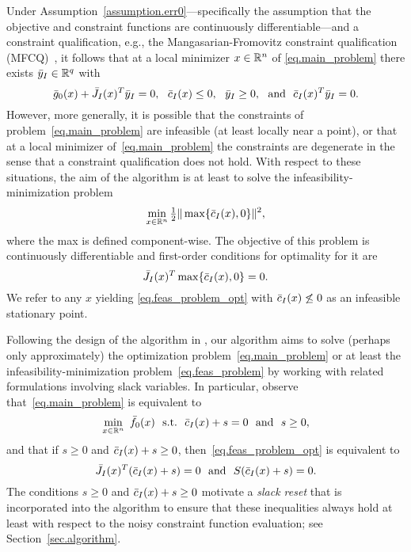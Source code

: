 Under Assumption~\ref{assumption.err0}---specifically the assumption that the objective and constraint functions are continuously differentiable---and a constraint qualification, e.g., the Mangasarian-Fromovitz constraint qualification (MFCQ)~\cite{MangFrom67}, it follows that at a local minimizer $x \in \mathbb{R}^n$ of \eqref{eq.main_problem} there exists ${\bar y}_I \in \mathbb{R}^q$ with
\begin{equation*}
  \gtrue_0(x) + \Jtrue_I(x)^T\ytrue_I = 0,\ \ \ctrue_I(x) \leq 0,\ \ \ytrue_I \geq 0,\ \ \text{and}\ \ \ctrue_I(x)^T\ytrue_I = 0.
\end{equation*}
However, more generally, it is possible that the constraints of problem~\eqref{eq.main_problem} are infeasible (at least locally near a point), or that at a local minimizer of~\eqref{eq.main_problem} the constraints are degenerate in the sense that a constraint qualification does not hold.  With respect to these situations, the aim of the algorithm is at least to solve the infeasibility-minimization problem
\begin{equation}\label{eq.feas_problem}
  \min_{x \in \mathbb{R}^n} \tfrac{1}{2} \| \max\{{\bar c}_I(x),0\} \|^2,
\end{equation}
where the max is defined component-wise.  The objective of this problem is continuously differentiable and first-order conditions for optimality for it are
\begin{equation}\label{eq.feas_problem_opt}
  {\bar J}_I(x)^T\max\{{\bar c}_I(x),0\} = 0.
\end{equation}
We refer to any $x$ yielding \eqref{eq.feas_problem_opt} with ${\bar c}_I(x) \not\leq 0$ as an infeasible stationary point.

Following the design of the algorithm in \cite{CurtScheWaec10}, our algorithm aims to solve (perhaps only approximately) the optimization problem~\eqref{eq.main_problem} or at least the infeasibility-minimization problem~\eqref{eq.feas_problem} by working with related formulations involving slack variables.  In particular, observe that~\eqref{eq.main_problem} is equivalent to
\begin{equation}\label{eq.main_problem_slack}
  \min_{x \in \RR^n}\ \ftrue_0(x)\ \ \st \ \ \ctrue_I(x) + s = 0\ \ \text{and}\ \ s \geq 0,
\end{equation}
and that if $s \geq 0$ and ${\bar c}_I(x) + s \geq 0$, then~\eqref{eq.feas_problem_opt} is equivalent to
\begin{equation}\label{eq.feas_problem_opt_slack}
  {\bar J}_I(x)^T({\bar c}_I(x) + s) = 0\ \ \text{and}\ \ S ({\bar c}_I(x) + s) = 0.
\end{equation}
The conditions $s \geq 0$ and ${\bar c}_I(x) + s \geq 0$ motivate a \textit{slack reset} that is incorporated into the algorithm to ensure that these inequalities always hold at least with respect to the noisy constraint function evaluation; see Section~\ref{sec.algorithm}.

